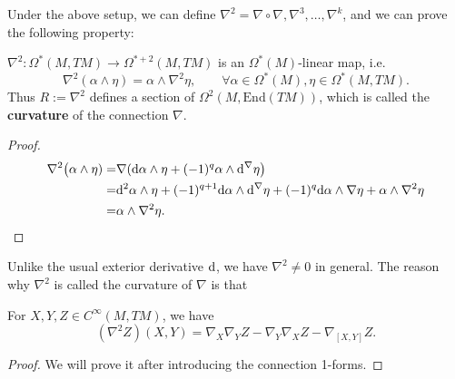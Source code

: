 Under the above setup, we can define $\nabla^2=\nabla\circ\nabla,\nabla^3,\dots,\nabla^k$, 
and we can prove the following property:
\begin{proposition}
    $\nabla^2: \Omega^*(M,TM)\to\Omega^{*+2}(M,TM)$ is an $\Omega^*(M)$-linear map, i.e.
    \begin{equation*}
        \nabla^2(\alpha\wedge\eta) = \alpha\wedge\nabla^2 \eta,
        \qquad\forall \alpha\in \Omega^*(M),\eta\in \Omega^*(M,TM).
    \end{equation*}
    Thus $R:=\nabla^2$ defines a section of $\Omega^2(M,\mathrm{End}(TM))$, 
    which is called the \textbf{curvature} of the connection $\nabla$.
\end{proposition}
\begin{proof}
    \begin{align*}
        \nabla^2\big(\alpha\wedge\eta) =& \nabla({\rm d}\alpha\wedge\eta + (-1)^{q}\alpha\wedge {\rm d}^\nabla\eta\big) \\
        =& {\rm d}^2\alpha\wedge\eta + (-1)^{q+1}{\rm d}\alpha\wedge {\rm d}^\nabla\eta + (-1)^q {\rm d}\alpha\wedge \nabla\eta + \alpha\wedge\nabla^2 \eta \\
        =& \alpha\wedge\nabla^2 \eta.
    \end{align*}
\end{proof}
Unlike the usual exterior derivative ${\rm d}$, we have $\nabla^2\neq 0$ in general.
The reason why $\nabla^2$ is called the curvature of $\nabla$ is that 
\begin{proposition}\label{prop:curvature}
    For $X,Y,Z\in C^\infty(M,TM)$, we have
    \begin{equation*}
        (\nabla^2 Z)(X,Y) = \nabla_X \nabla_Y Z - \nabla_Y \nabla_X Z - \nabla_{[X,Y]} Z.
    \end{equation*}
\end{proposition}
\begin{proof}
    We will prove it after introducing the connection 1-forms.
\end{proof}

